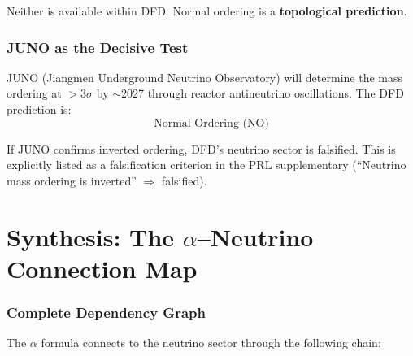 \documentclass[11pt,a4paper]{article}
\begin{document}
Neither is available within DFD. Normal ordering is a \textbf{topological
prediction}.

\section{JUNO as the Decisive Test}

JUNO (Jiangmen Underground Neutrino Observatory) will determine the mass
ordering at $> 3\sigma$ by $\sim$2027 through reactor antineutrino
oscillations. The DFD prediction is:
\begin{equation}
\boxed{\text{Normal Ordering (NO)}}
\end{equation}

If JUNO confirms inverted ordering, DFD's neutrino sector is falsified.
This is explicitly listed as a falsification criterion in the PRL
supplementary (``Neutrino mass ordering is inverted'' $\Rightarrow$
falsified).


\part{Synthesis: The $\alpha$--Neutrino Connection Map}

\section{Complete Dependency Graph}

The $\alpha$ formula connects to the neutrino sector through the following
chain:
\end{document}
